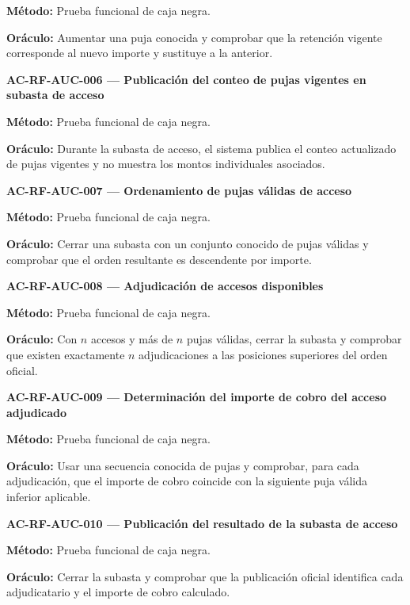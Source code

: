 \documentclass[10pt,letterpaper]{article}
\begin{document}
\textbf{Método:} Prueba funcional de caja negra.\par
\textbf{Oráculo:} Aumentar una puja conocida y comprobar que la retención vigente corresponde al nuevo importe y sustituye a la anterior.\par\vspace{0.45em}
\noindent\textbf{AC-RF-AUC-006 --- Publicación del conteo de pujas vigentes en subasta de acceso}\par
\textbf{Método:} Prueba funcional de caja negra.\par
\textbf{Oráculo:} Durante la subasta de acceso, el sistema publica el conteo actualizado de pujas vigentes y no muestra los montos individuales asociados.\par\vspace{0.45em}
\noindent\textbf{AC-RF-AUC-007 --- Ordenamiento de pujas válidas de acceso}\par
\textbf{Método:} Prueba funcional de caja negra.\par
\textbf{Oráculo:} Cerrar una subasta con un conjunto conocido de pujas válidas y comprobar que el orden resultante es descendente por importe.\par\vspace{0.45em}
\noindent\textbf{AC-RF-AUC-008 --- Adjudicación de accesos disponibles}\par
\textbf{Método:} Prueba funcional de caja negra.\par
\textbf{Oráculo:} Con $n$ accesos y más de $n$ pujas válidas, cerrar la subasta y comprobar que existen exactamente $n$ adjudicaciones a las posiciones superiores del orden oficial.\par\vspace{0.45em}
\noindent\textbf{AC-RF-AUC-009 --- Determinación del importe de cobro del acceso adjudicado}\par
\textbf{Método:} Prueba funcional de caja negra.\par
\textbf{Oráculo:} Usar una secuencia conocida de pujas y comprobar, para cada adjudicación, que el importe de cobro coincide con la siguiente puja válida inferior aplicable.\par\vspace{0.45em}
\noindent\textbf{AC-RF-AUC-010 --- Publicación del resultado de la subasta de acceso}\par
\textbf{Método:} Prueba funcional de caja negra.\par
\textbf{Oráculo:} Cerrar la subasta y comprobar que la publicación oficial identifica cada adjudicatario y el importe de cobro calculado.\par\vspace{0.45em}
\end{document}
